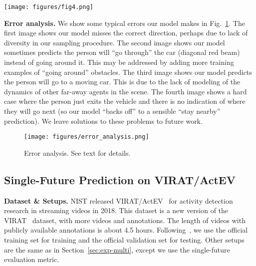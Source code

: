 \documentclass[10pt,twocolumn,letterpaper]{article}
\begin{document}
\begin{figure*}[!t]
\vspace{-4mm}
	\centering
		\texttt{[image: figures/fig4.png]}
		\vspace{-7mm}
	\caption{Qualitative analysis. The red trajectories are single-future method predictions and the yellow-orange heatmaps are multi-future method predictions. The yellow trajectories are observations and the green ones are ground truth multi-future trajectories. See text for details.}  
	\label{fig:qual}
	\vspace{-6mm}
\end{figure*}



\noindent\textbf{Error analysis.}
We show some typical errors our model makes in Fig.~\ref{fig:error_analysis}.
The first image shows our model misses the correct direction,
perhaps due to lack of diversity in our sampling procedure.
The second image shows our model 
sometimes predicts the person will ``go through'' the car
(diagonal red beam)
instead of going around it. This may be addressed by adding more training examples of ``going around'' obstacles.
The third image shows
our model predicts the person will go to a moving car.
This is due to the lack of modeling of the dynamics of other far-away agents in the scene. 
The fourth image shows a hard case where the person just exits the vehicle and there is no indication of where they will go next (so our model ``backs off'' to a sensible
``stay nearby'' prediction).
We leave solutions to these problems to future work.


\begin{figure}[!t]
	\centering
	    \vspace{-2mm}
		\texttt{[image: figures/error\_analysis.png]}
		\vspace{-4mm}
	\caption{Error analysis. See text for details.}  
	\label{fig:error_analysis}
	\vspace{-4mm}
\end{figure}









 \subsection{Single-Future Prediction on VIRAT/ActEV}
\label{sec:exp-virat}

\noindent\textbf{Dataset \& Setups.} NIST released VIRAT/ActEV~\cite{2018trecvidawad} for activity detection research in streaming videos in 2018. 
This dataset is a new version of the VIRAT~\cite{oh2011large} dataset, with more videos and annotations. The length of videos with publicly available annotations is about 4.5 hours.
Following~\cite{liang2019peeking}, we use the official training set for training and the official validation set for testing. Other setups are the same as in Section~\ref{sec:exp-multi},
except 
we use the single-future evaluation metric.
\end{document}
